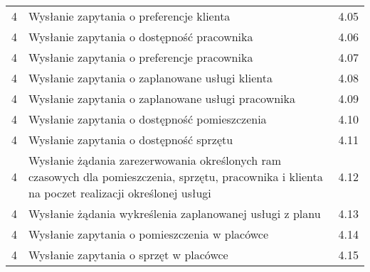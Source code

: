 \begin{tabular}{c|p{5cm}|c}
4 & Wysłanie zapytania o preferencje klienta & 4.05\\
4 & Wysłanie zapytania o dostępność pracownika & 4.06\\
4 & Wysłanie zapytania o preferencje pracownika & 4.07\\
4 & Wysłanie zapytania o zaplanowane usługi klienta & 4.08\\
4 & Wysłanie zapytania o zaplanowane usługi pracownika & 4.09\\
4 & Wysłanie zapytania o dostępność pomieszczenia & 4.10\\
4 & Wysłanie zapytania o dostępność sprzętu & 4.11\\
4 & Wysłanie żądania zarezerwowania określonych ram czasowych dla pomieszczenia, sprzętu, pracownika i klienta na poczet realizacji określonej usługi & 4.12\\
4 & Wysłanie żądania wykreślenia zaplanowanej usługi z planu & 4.13\\
4 & Wysłanie zapytania o pomieszczenia w placówce & 4.14\\
4 & Wysłanie zapytania o sprzęt w placówce & 4.15\\
\end{tabular}



